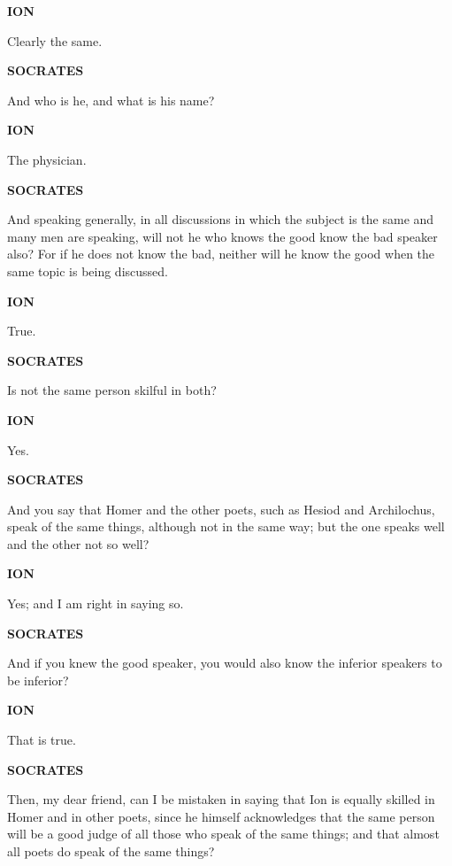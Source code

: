 \documentclass[11pt,letter]{article}
\begin{document}
\par \textbf{ION}
\par   Clearly the same.

\par \textbf{SOCRATES}
\par   And who is he, and what is his name?

\par \textbf{ION}
\par   The physician.

\par \textbf{SOCRATES}
\par   And speaking generally, in all discussions in which the subject is the same and many men are speaking, will not he who knows the good know the bad speaker also? For if he does not know the bad, neither will he know the good when the same topic is being discussed.

\par \textbf{ION}
\par   True.

\par \textbf{SOCRATES}
\par   Is not the same person skilful in both?

\par \textbf{ION}
\par   Yes.

\par \textbf{SOCRATES}
\par   And you say that Homer and the other poets, such as Hesiod and Archilochus, speak of the same things, although not in the same way; but the one speaks well and the other not so well?

\par \textbf{ION}
\par   Yes; and I am right in saying so.

\par \textbf{SOCRATES}
\par   And if you knew the good speaker, you would also know the inferior speakers to be inferior?

\par \textbf{ION}
\par   That is true.

\par \textbf{SOCRATES}
\par   Then, my dear friend, can I be mistaken in saying that Ion is equally skilled in Homer and in other poets, since he himself acknowledges that the same person will be a good judge of all those who speak of the same things; and that almost all poets do speak of the same things?
\end{document}
